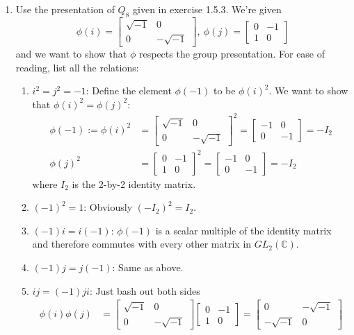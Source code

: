 \documentclass[]{article}
\newcommand{\bbc}{\mathbb{C}}
\begin{document}
\begin{enumerate}
\item Use the presentation of $Q_8$ given in exercise 1.5.3. We're given
\begin{equation}
\phi(i) = \begin{bmatrix}\sqrt{-1}&0\\0&-\sqrt{-1}\end{bmatrix},\ \phi(j) = \begin{bmatrix}0&-1\\1&0\end{bmatrix}
\end{equation}
and we want to show that $\phi$ respects the group presentation. For ease of reading, list all the relations:
\begin{enumerate}
\item \underline{$i^2 = j^2 = -1$}: Define the element $\phi(-1)$ to be $\phi(i)^2$. We want to show that $\phi(i)^2 = \phi(j)^2$:
\begin{align}
\phi(-1) := \phi(i)^2 &= \begin{bmatrix}\sqrt{-1}&0\\0&-\sqrt{-1}\end{bmatrix}^2 = \begin{bmatrix}-1&0\\0&-1\end{bmatrix} = -I_2 \\
\phi(j)^2 &= \begin{bmatrix}0&-1\\1&0\end{bmatrix}^2 = \begin{bmatrix}-1&0\\0&-1\end{bmatrix} = -I_2
\end{align}
where $I_2$ is the 2-by-2 identity matrix.
\item \underline{$(-1)^2 = 1$}: Obviously $(-I_2)^2 = I_2$.
\item \underline{$(-1)i = i(-1)$}: $\phi(-1)$ is a scalar multiple of the identity matrix and therefore commutes with every other matrix in $GL_2(\bbc)$.
\item \underline{$(-1)j = j(-1)$}: Same as above.
\item \underline{$ij = (-1)ji$}: Just bash out both sides
\begin{align}
\phi(i)\phi(j) &= \begin{bmatrix}\sqrt{-1}&0\\0&-\sqrt{-1}\end{bmatrix} \begin{bmatrix}0&-1\\1&0\end{bmatrix} =  \begin{bmatrix}0&-\sqrt{-1}\\-\sqrt{-1}&0\end{bmatrix}  \\

\end{align}
\end{enumerate}
\end{enumerate}
\end{document}
